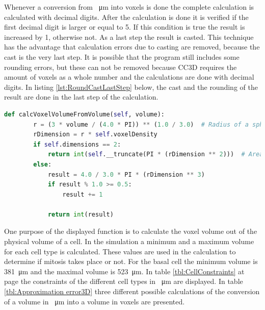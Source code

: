 Whenever a conversion from \SI{}{\micro\metre} into voxels is done the complete calculation is calculated with decimal digits. After the calculation is done it is verified if the first decimal digit is larger or equal to 5. If this condition is true the result is increased by 1, otherwise not. As a last step the result is casted. This technique has the advantage that calculation errors due to casting are removed, because the cast is the very last step. It is possible that the program still includes some rounding errors, but these can not be removed because \ac{CC3D} requires the amount of voxels as a whole number and the calculations are done with decimal digits. \newline
In listing \ref{lst:RoundCastLastStep} below, the cast and the rounding of the result are done in the last step of the calculation.

\begin{lstlisting}[language=Python, caption = {[Modified function to calculate the volume of a cell in voxel out of a physical volume]Function to calculate the volume of a sphere in voxels out of a given physical volume. First out of the given physical volume the radius is calculated. Then it is converted into the voxel unit. Next\, the volume of the voxel sphere is calculated and as last step\, the result is rounded and casted.}, label=lst:RoundCastLastStep]
   def calcVoxelVolumeFromVolume(self, volume):
        r = (3 * volume / (4.0 * PI)) ** (1.0 / 3.0)  # Radius of a sphere with known volume.
        rDimension = r * self.voxelDensity
        if self.dimensions == 2:
            return int(self.__truncate(PI * (rDimension ** 2)))  # Area of a circle.
        else:
            result = 4.0 / 3.0 * PI * (rDimension ** 3)
            if result % 1.0 >= 0.5:
                result += 1

            return int(result)
\end{lstlisting}

One purpose of the displayed function is to calculate the voxel volume out of the physical volume of a cell. In the simulation a minimum and a maximum volume for each cell type is calculated. These values are used in the calculation to determine if mitosis takes place or not. \newline
For the basal cell the minimum volume is \SI{381}{\micro\metre} and the maximal volume is \SI{523}{\micro\metre}. In table \ref{tbl:CellConstraints} at page \pageref{tbl:CellConstraints} the constraints of the different cell types in \SI{}{\micro\metre} are displayed. In table \ref{tbl:Approximation error3D} three different possible calculations of the conversion of a volume in \SI{}{\micro\metre} into a volume in voxels are presented.

